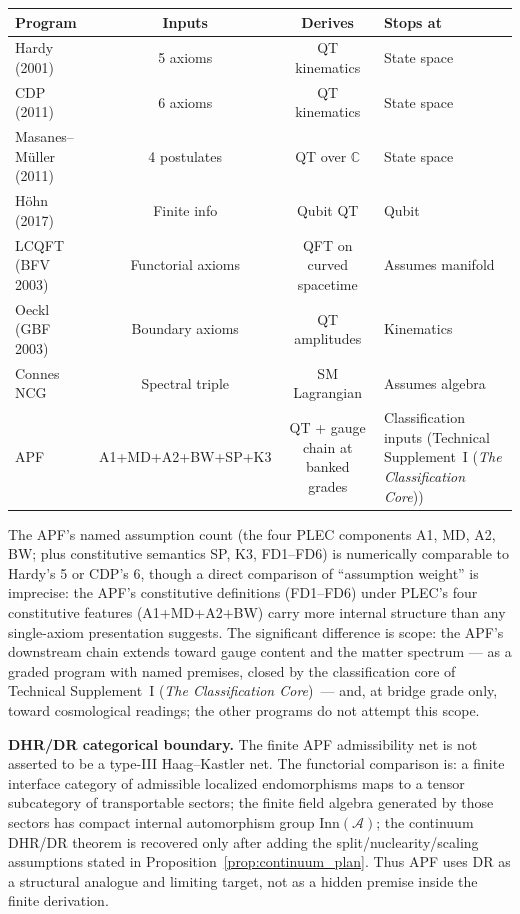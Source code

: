 \documentclass[11pt]{article}
\theoremstyle{definition}
\newcommand{\TSI}{Technical Supplement~I (\emph{The Classification Core})}
\begin{document}
\smallskip
\begin{center}
\small
\begin{tabular}{@{}lccl@{}}
\toprule
\textbf{Program} & \textbf{Inputs} & \textbf{Derives} & \textbf{Stops at} \\
\midrule
Hardy (2001) & 5 axioms & QT kinematics & State space \\
CDP (2011) & 6 axioms & QT kinematics & State space \\
Masanes--M\"uller (2011) & 4 postulates & QT over $\mathbb{C}$ & State space \\
H\"ohn (2017) & Finite info & Qubit QT & Qubit \\
LCQFT (BFV 2003) & Functorial axioms & QFT on curved spacetime & Assumes manifold \\
Oeckl (GBF 2003) & Boundary axioms & QT amplitudes & Kinematics \\
Connes NCG & Spectral triple & SM Lagrangian & Assumes algebra \\
APF & A1+MD+A2+BW+SP+K3 & QT + gauge chain at banked grades & Classification inputs (\TSI) \\
\bottomrule
\end{tabular}
\end{center}

\smallskip\noindent The APF's named assumption count (the four PLEC components A1, MD, A2, BW; plus constitutive semantics SP, K3, FD1--FD6) is numerically comparable to Hardy's 5 or CDP's 6,
though a direct comparison of ``assumption weight'' is imprecise: the
APF's constitutive definitions (FD1--FD6) under PLEC's four
constitutive features (A1+MD+A2+BW) carry more internal structure
than any single-axiom presentation suggests.  The significant
difference is scope: the APF's
downstream chain extends toward gauge content and the matter spectrum
--- as a graded program with named premises, closed by the
classification core of \TSI\ --- and, at bridge grade only, toward
cosmological readings; the other programs do not attempt this scope.


\smallskip\noindent\textbf{DHR/DR categorical boundary.}\quad
The finite APF admissibility net is not asserted to be a type-III Haag--Kastler net.  The functorial comparison is: a finite interface category of admissible localized endomorphisms maps to a tensor subcategory of transportable sectors; the finite field algebra generated by those sectors has compact internal automorphism group $\mathrm{Inn}(\mathcal A)$; the continuum DHR/DR theorem is recovered only after adding the split/nuclearity/scaling assumptions stated in Proposition~\ref{prop:continuum_plan}.  Thus APF uses DR as a structural analogue and limiting target, not as a hidden premise inside the finite derivation.
\end{document}
